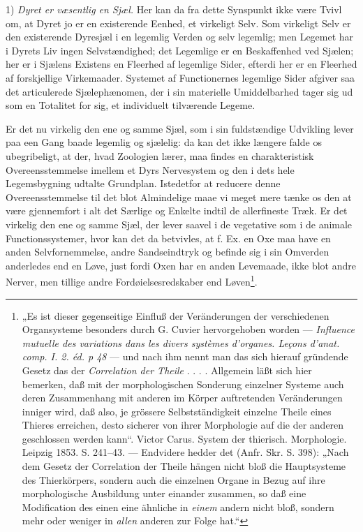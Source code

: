 \documentclass[11pt]{book}
\newcommand{\opage}[1]{\marginnote{\footnotesize\textit{[#1]}}}
\begin{document}
1) \emph{Dyret er væsentlig en Sjæl.} Her kan da fra dette Synspunkt
ikke være Tvivl om, at Dyret jo er en existerende Eenhed, et
virkeligt Selv. Som virkeligt Selv er den existerende Dyresjæl i en
legemlig Verden og selv legemlig; men Legemet har i Dyrets Liv ingen
Selvstændighed; det Legemlige er en Beskaffenhed ved Sjælen; her er i
Sjælens Existens en Fleerhed af legemlige Sider, efterdi her er en
Fleerhed af forskjellige Virkemaader. Systemet af Functionernes
legemlige Sider afgiver saa det articulerede Sjælephænomen, der i sin
materielle Umiddelbarhed tager sig ud som en Totalitet for sig, et
individuelt tilværende Legeme.

\opage{381} \setcounter{footnote}{0}%
Er det nu virkelig den ene og samme Sjæl, som i sin fuldstændige
Udvikling lever paa een Gang baade legemlig og sjælelig: da kan det
ikke længere falde os ubegribeligt, at der, hvad Zoologien lærer, maa
findes en charakteristisk Overeensstemmelse imellem et Dyrs
Nervesystem og den i dets hele Legemsbygning udtalte Grundplan.
Istedetfor at reducere denne Overeensstemmelse til det blot
Almindelige maae vi meget mere tænke os den at være gjennemfort i alt
det Særlige og Enkelte indtil de allerfineste Træk. Er det virkelig
den ene og samme Sjæl, der lever saavel i de vegetative som i de
animale Functionssystemer, hvor kan det da betvivles, at f. Ex. en
Oxe maa have en anden Selvfornemmelse, andre Sandseindtryk og befinde
sig i sin Omverden anderledes end en Løve, just fordi Oxen har en
anden Levemaade, ikke blot andre Nerver, men tillige andre
Fordøielsesredskaber end Løven\footnote{„Es ist dieser gegenseitige
Einfluß der Veränderungen der verschiedenen Organsysteme besonders
durch G. Cuvier hervorgehoben worden --- \textit{Influence mutuelle
des variations dans les divers systèmes d'organes. Leçons d'anat.
comp. I. 2. éd. p 48} --- und nach ihm nennt man das sich hierauf
gründende Gesetz das der \emph{Correlation der Theile} . . . .
Allgemein läßt sich hier bemerken, daß mit der morphologischen
Sonderung einzelner Systeme auch deren Zusammenhang mit anderen im
Körper auftretenden Veränderungen inniger wird, daß also, je grössere
Selbstständigkeit einzelne Theile eines Thieres erreichen, desto
sicherer von ihrer Morphologie auf die der anderen geschlossen werden
kann“. Victor Carus. System der thierisch. Morphologie. Leipzig
1853. S. 241--43. --- Endvidere hedder det (Anfr. Skr. S. 398): „Nach
dem Gesetz der Correlation der Theile hängen nicht bloß die
Hauptsysteme des Thierkörpers, sondern auch die einzelnen Organe in
Bezug auf ihre morphologische Ausbildung unter einander zusammen, so
daß eine Modification des einen eine ähnliche in \emph{einem} andern
nicht bloß, sondern mehr oder weniger in \emph{allen} anderen zur
Folge hat.“}.
\end{document}

